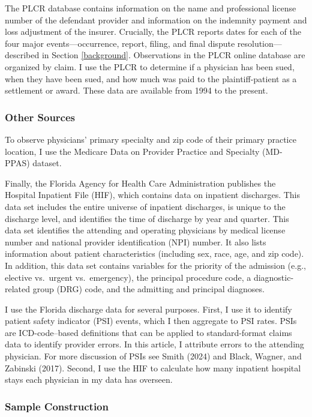 \documentclass[
  12pt,
]{article}
\begin{document}
The PLCR database contains information on the name and professional license number of the defendant provider and information on the indemnity payment and loss adjustment of the insurer. Crucially, the PLCR reports dates for each of the four major events---occurrence, report, filing, and final dispute resolution---described in Section \ref{background}. Observations in the PLCR online database are organized by claim. I use the PLCR to determine if a physician has been sued, when they have been sued, and how much was paid to the plaintiff-patient as a settlement or award. These data are available from 1994 to the present.

\hypertarget{other-sources}{%
\subsubsection{Other Sources}\label{other-sources}}

To observe physicians' primary specialty and zip code of their primary practice location, I use the Medicare Data on Provider Practice and Specialty (MD-PPAS) dataset.

Finally, the Florida Agency for Health Care Administration publishes the Hospital Inpatient File (HIF), which contains data on inpatient discharges. This data set includes the entire universe of inpatient discharges, is unique to the discharge level, and identifies the time of discharge by year and quarter. This data set identifies the attending and operating physicians by medical license number and national provider identification (NPI) number. It also lists information about patient characteristics (including sex, race, age, and zip code). In addition, this data set contains variables for the priority of the admission (e.g., elective vs.~urgent vs.~emergency), the principal procedure code, a diagnostic-related group (DRG) code, and the admitting and principal diagnoses.

I use the Florida discharge data for several purposes. First, I use it to identify patient safety indicator (PSI) events, which I then aggregate to PSI rates. PSIs are ICD-code--based definitions that can be applied to standard-format claims data to identify provider errors. In this article, I attribute errors to the attending physician. For more discussion of PSIs see Smith (2024) and Black, Wagner, and Zabinski (2017). Second, I use the HIF to calculate how many inpatient hospital stays each physician in my data has overseen.

\hypertarget{sample-construction}{%
\subsubsection{Sample Construction}\label{sample-construction}}
\end{document}
